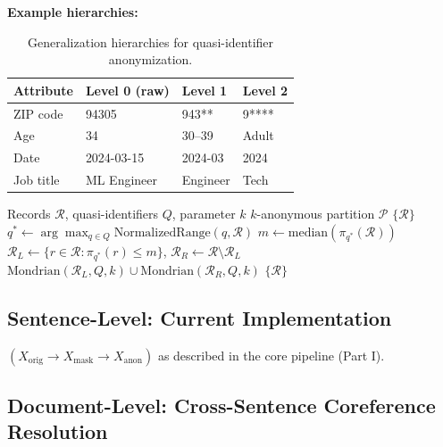 \documentclass[11pt, a4paper]{article}
\begin{document}
\textbf{Example hierarchies:}

\begin{table}[H]
\centering
\small
\begin{tabular}{llll}
\toprule
\textbf{Attribute} & \textbf{Level 0 (raw)} & \textbf{Level 1} & \textbf{Level 2} \\
\midrule
ZIP code & 94305 & 943** & 9**** \\
Age & 34 & 30--39 & Adult \\
Date & 2024-03-15 & 2024-03 & 2024 \\
Job title & ML Engineer & Engineer & Tech \\
\bottomrule
\end{tabular}
\caption{Generalization hierarchies for quasi-identifier anonymization.}
\end{table}

\begin{algorithm}[H]
\caption{Optimal $k$-Anonymous Generalization (Mondrian)}
\label{alg:mondrian}
\begin{algorithmic}[1]
\Require Records $\mathcal{R}$, quasi-identifiers $Q$, parameter $k$
\Ensure $k$-anonymous partition $\mathcal{P}$
    \State \Return $\{\mathcal{R}\}$ 
\EndIf
\State $q^* \leftarrow \arg\max_{q \in Q} \text{NormalizedRange}(q, \mathcal{R})$
\State $m \leftarrow \text{median}(\pi_{q^*}(\mathcal{R}))$
\State $\mathcal{R}_L \leftarrow \{r \in \mathcal{R} : \pi_{q^*}(r) \leq m\}$, $\mathcal{R}_R \leftarrow \mathcal{R} \setminus \mathcal{R}_L$
    \State \Return $\text{Mondrian}(\mathcal{R}_L, Q, k) \cup \text{Mondrian}(\mathcal{R}_R, Q, k)$
\Else
    \State \Return $\{\mathcal{R}\}$
\EndIf
\end{algorithmic}
\end{algorithm}

\subsection{Sentence-Level: Current Implementation}
$(X_{\text{orig}} \rightarrow X_{\text{mask}} \rightarrow X_{\text{anon}})$ as described in the core pipeline (Part I).

\subsection{Document-Level: Cross-Sentence Coreference Resolution}
\end{document}
